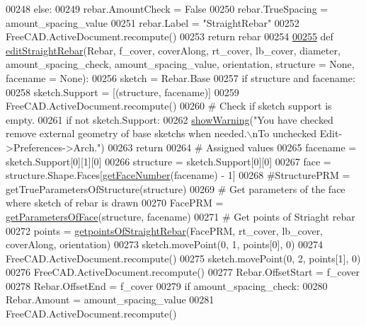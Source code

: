 \begin{DoxyCode}
00248     \textcolor{keywordflow}{else}:
00249         rebar.AmountCheck = \textcolor{keyword}{False}
00250         rebar.TrueSpacing = amount\_spacing\_value
00251     rebar.Label = \textcolor{stringliteral}{"StraightRebar"}
00252     FreeCAD.ActiveDocument.recompute()
00253     \textcolor{keywordflow}{return} rebar
00254 
\hypertarget{StraightRebar_8py_source.tex_l00255}{}\hyperlink{namespaceStraightRebar_ab4c578165b01dd7c7d121e5345de2d7b}{00255} \textcolor{keyword}{def }\hyperlink{namespaceStraightRebar_ab4c578165b01dd7c7d121e5345de2d7b}{editStraightRebar}(Rebar, f\_cover, coverAlong, rt\_cover, lb\_cover, diameter, 
      amount\_spacing\_check, amount\_spacing\_value, orientation, structure = None, facename = None):
00256     sketch = Rebar.Base
00257     \textcolor{keywordflow}{if} structure \textcolor{keywordflow}{and} facename:
00258         sketch.Support = [(structure, facename)]
00259         FreeCAD.ActiveDocument.recompute()
00260     \textcolor{comment}{# Check if sketch support is empty.}
00261     \textcolor{keywordflow}{if} \textcolor{keywordflow}{not} sketch.Support:
00262         \hyperlink{namespaceRebarfunc_a2278a0602d46a62953af1fcf2e574a94}{showWarning}(\textcolor{stringliteral}{"You have checked remove external geometry of base sketchs when needed.\(\backslash\)nTo
       unchecked Edit->Preferences->Arch."})
00263         \textcolor{keywordflow}{return}
00264     \textcolor{comment}{# Assigned values}
00265     facename = sketch.Support[0][1][0]
00266     structure = sketch.Support[0][0]
00267     face = structure.Shape.Faces[\hyperlink{namespaceRebarfunc_a3885b3b63e3a41508ac79bc7550cf301}{getFaceNumber}(facename) - 1]
00268     \textcolor{comment}{#StructurePRM = getTrueParametersOfStructure(structure)}
00269     \textcolor{comment}{# Get parameters of the face where sketch of rebar is drawn}
00270     FacePRM = \hyperlink{namespaceRebarfunc_a92122b3d7cedd3d47bb63380a5ac4d08}{getParametersOfFace}(structure, facename)
00271     \textcolor{comment}{# Get points of Striaght rebar}
00272     points = \hyperlink{namespaceStraightRebar_a1873c6f7f59b355a64fdd966ad75f778}{getpointsOfStraightRebar}(FacePRM, rt\_cover, lb\_cover, coverAlong, 
      orientation)
00273     sketch.movePoint(0, 1, points[0], 0)
00274     FreeCAD.ActiveDocument.recompute()
00275     sketch.movePoint(0, 2, points[1], 0)
00276     FreeCAD.ActiveDocument.recompute()
00277     Rebar.OffsetStart = f\_cover
00278     Rebar.OffsetEnd = f\_cover
00279     \textcolor{keywordflow}{if} amount\_spacing\_check:
00280         Rebar.Amount = amount\_spacing\_value
00281         FreeCAD.ActiveDocument.recompute()

\end{DoxyCode}
